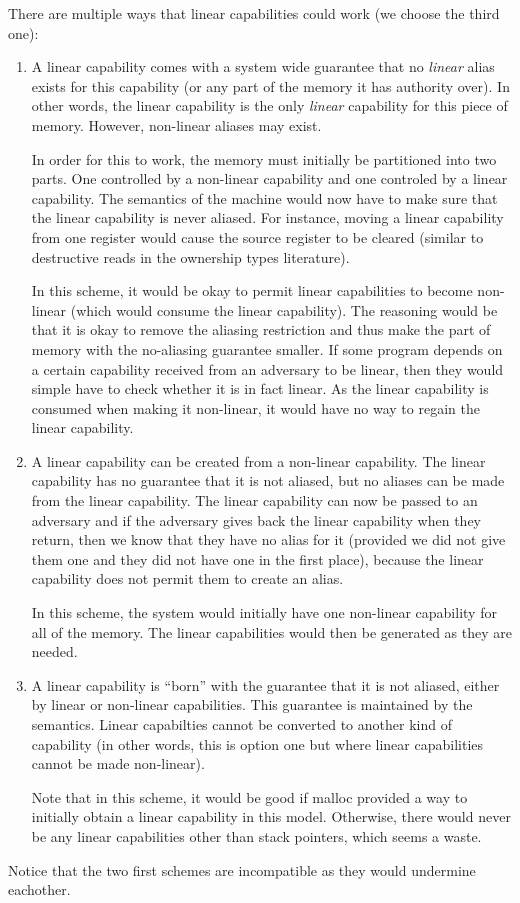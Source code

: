 \documentclass[a4paper]{article}
\begin{document}
There are multiple ways that linear capabilities could work (we choose the third one):
\begin{enumerate}
\item A linear capability comes with a system wide guarantee that no \emph{linear} alias exists for this capability (or any part of the memory it has authority over). In other words, the linear capability is the only \emph{linear} capability for this piece of memory.  However, non-linear aliases may exist.

In order for this to work, the memory must initially be partitioned into two parts. One controlled by a non-linear capability and one controled by a linear capability. The semantics of the machine would now have to make sure that the linear capability is never aliased. For instance, moving a linear capability from one register would cause the source register to be cleared (similar to destructive reads in the ownership types literature). 

In this scheme, it would be okay to permit linear capabilities to become non-linear (which would consume the linear capability). The reasoning would be that it is okay to remove the aliasing restriction and thus make the part of memory with the no-aliasing guarantee smaller. If some program depends on a certain capability received from an adversary to be linear, then they would simple have to check whether it is in fact linear. As the linear capability is consumed when making it non-linear, it would have no way to regain the linear capability.

\item A linear capability can be created from a non-linear capability. The linear capability has no guarantee that it is not aliased, but no aliases can be made from the linear capability. The linear capability can now be passed to an adversary and if the adversary gives back the linear capability when they return, then we know that they have no alias for it (provided we did not give them one and they did not have one in the first place), because the linear capability does not permit them to create an alias.

In this scheme, the system would initially have one non-linear capability for all of the memory. The linear capabilities would then be generated as they are needed.
\item A linear capability is ``born'' with the guarantee that it is not aliased, either by linear or non-linear capabilities. This guarantee is maintained by the semantics. Linear capabilties cannot be converted to another kind of capability (in other words, this is option one but where linear capabilities cannot be made non-linear).

Note that in this scheme, it would be good if malloc provided a way to initially obtain a linear capability in this model.
Otherwise, there would never be any linear capabilities other than stack pointers, which seems a waste.
\end{enumerate}
Notice that the two first schemes are incompatible as they would undermine eachother.
\end{document}
